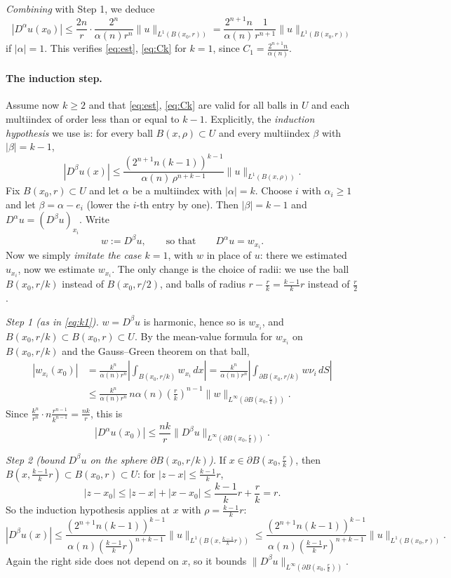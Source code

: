 \documentclass[11pt]{article}
\theoremstyle{plain}
\theoremstyle{definition}
\theoremstyle{remark}
\begin{document}
\emph{Combining} with Step 1, we deduce
$$ |D^\alpha u(x_0)| \leq \frac{2n}{r}\cdot\frac{2^n}{\alpha(n) r^n}\|u\|_{L^1(B(x_0,r))} = \frac{2^{n+1}n}{\alpha(n)}\frac{1}{r^{n+1}}\|u\|_{L^1(B(x_0,r))} $$
if $|\alpha| = 1$. This verifies \eqref{eq:est}, \eqref{eq:Ck} for $k = 1$, since $C_1 = \frac{2^{n+1}n}{\alpha(n)}$.

\paragraph{The induction step.} Assume now $k \geq 2$ and that \eqref{eq:est}, \eqref{eq:Ck} are valid for all balls in $U$ and each multiindex of order less than or equal to $k-1$. Explicitly, the \emph{induction hypothesis} we use is: for every ball $B(x,\rho) \subset U$ and every multiindex $\beta$ with $|\beta| = k - 1$,
$$ |D^\beta u(x)| \leq \frac{(2^{n+1}n(k-1))^{k-1}}{\alpha(n)\,\rho^{n+k-1}}\|u\|_{L^1(B(x,\rho))}. $$
Fix $B(x_0,r) \subset U$ and let $\alpha$ be a multiindex with $|\alpha| = k$. Choose $i$ with $\alpha_i \geq 1$ and let $\beta = \alpha - e_i$ (lower the $i$-th entry by one). Then $|\beta| = k - 1$ and $D^\alpha u = (D^\beta u)_{x_i}$. Write
$$ w := D^\beta u, \qquad \text{so that} \qquad D^\alpha u = w_{x_i}. $$
Now we simply \emph{imitate the case $k = 1$}, with $w$ in place of $u$: there we estimated $u_{x_i}$, now we estimate $w_{x_i}$. The only change is the choice of radii: we use the ball $B(x_0, r/k)$ instead of $B(x_0, r/2)$, and balls of radius $r - \frac rk = \frac{k-1}{k}r$ instead of $\frac r2$.

\emph{Step 1 (as in \eqref{eq:k1}).} $w = D^\beta u$ is harmonic, hence so is $w_{x_i}$, and $B(x_0,r/k) \subset B(x_0,r) \subset U$. By the mean-value formula for $w_{x_i}$ on $B(x_0,r/k)$ and the Gauss--Green theorem on that ball,
\begin{align*}
|w_{x_i}(x_0)| &= \frac{k^n}{\alpha(n)r^n}\left|\int_{B(x_0,r/k)} w_{x_i}\, dx\right| = \frac{k^n}{\alpha(n)r^n}\left|\int_{\partial B(x_0,r/k)} w\nu_i\, dS\right| \\
&\leq \frac{k^n}{\alpha(n) r^n}\, n\alpha(n)\left(\frac rk\right)^{n-1}\|w\|_{L^\infty(\partial B(x_0,\frac rk))}.
\end{align*}
Since $\frac{k^n}{r^n}\cdot n\frac{r^{n-1}}{k^{n-1}} = \frac{nk}{r}$, this is
$$ |D^\alpha u(x_0)| \leq \frac{nk}{r}\|D^\beta u\|_{L^\infty(\partial B(x_0,\frac rk))}. $$

\emph{Step 2 (bound $D^\beta u$ on the sphere $\partial B(x_0, r/k)$).} If $x \in \partial B(x_0,\frac rk)$, then $B(x, \frac{k-1}{k}r) \subset B(x_0,r) \subset U$: for $|z - x| \leq \frac{k-1}{k}r$,
$$ |z - x_0| \leq |z - x| + |x - x_0| \leq \frac{k-1}{k}r + \frac rk = r. $$
So the induction hypothesis applies at $x$ with $\rho = \frac{k-1}{k}r$:
$$ |D^\beta u(x)| \leq \frac{(2^{n+1}n(k-1))^{k-1}}{\alpha(n)\left(\frac{k-1}{k}r\right)^{n+k-1}}\|u\|_{L^1(B(x,\frac{k-1}{k}r))} \leq \frac{(2^{n+1}n(k-1))^{k-1}}{\alpha(n)\left(\frac{k-1}{k}r\right)^{n+k-1}}\|u\|_{L^1(B(x_0,r))}. $$
Again the right side does not depend on $x$, so it bounds $\|D^\beta u\|_{L^\infty(\partial B(x_0,\frac rk))}$.
\end{document}
